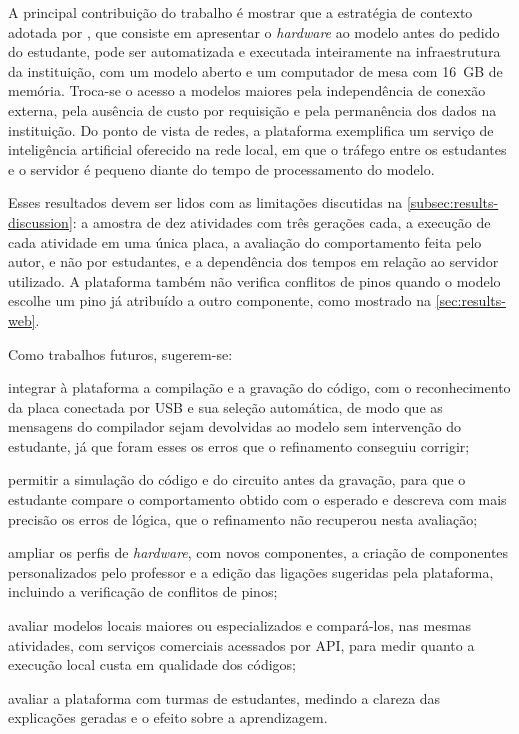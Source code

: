 A principal contribuição do trabalho é mostrar que a estratégia de contexto adotada por , que consiste em apresentar o \textit{hardware} ao modelo antes do pedido do estudante, pode ser automatizada e executada inteiramente na infraestrutura da instituição, com um modelo aberto e um computador de mesa com 16~GB de memória. Troca-se o acesso a modelos maiores pela independência de conexão externa, pela ausência de custo por requisição e pela permanência dos dados na instituição. Do ponto de vista de redes, a plataforma exemplifica um serviço de inteligência artificial oferecido na rede local, em que o tráfego entre os estudantes e o servidor é pequeno diante do tempo de processamento do modelo.

Esses resultados devem ser lidos com as limitações discutidas na \autoref{subsec:results-discussion}: a amostra de dez atividades com três gerações cada, a execução de cada atividade em uma única placa, a avaliação do comportamento feita pelo autor, e não por estudantes, e a dependência dos tempos em relação ao servidor utilizado. A plataforma também não verifica conflitos de pinos quando o modelo escolhe um pino já atribuído a outro componente, como mostrado na \autoref{sec:results-web}.

Como trabalhos futuros, sugerem-se:

\begin{alineas}
  \item integrar à plataforma a compilação e a gravação do código, com o reconhecimento da placa conectada por USB e sua seleção automática, de modo que as mensagens do compilador sejam devolvidas ao modelo sem intervenção do estudante, já que foram esses os erros que o refinamento conseguiu corrigir;
  \item permitir a simulação do código e do circuito antes da gravação, para que o estudante compare o comportamento obtido com o esperado e descreva com mais precisão os erros de lógica, que o refinamento não recuperou nesta avaliação;
  \item ampliar os perfis de \textit{hardware}, com novos componentes, a criação de componentes personalizados pelo professor e a edição das ligações sugeridas pela plataforma, incluindo a verificação de conflitos de pinos;
  \item avaliar modelos locais maiores ou especializados e compará-los, nas mesmas atividades, com serviços comerciais acessados por API, para medir quanto a execução local custa em qualidade dos códigos;
  \item avaliar a plataforma com turmas de estudantes, medindo a clareza das explicações geradas e o efeito sobre a aprendizagem.
\end{alineas}
